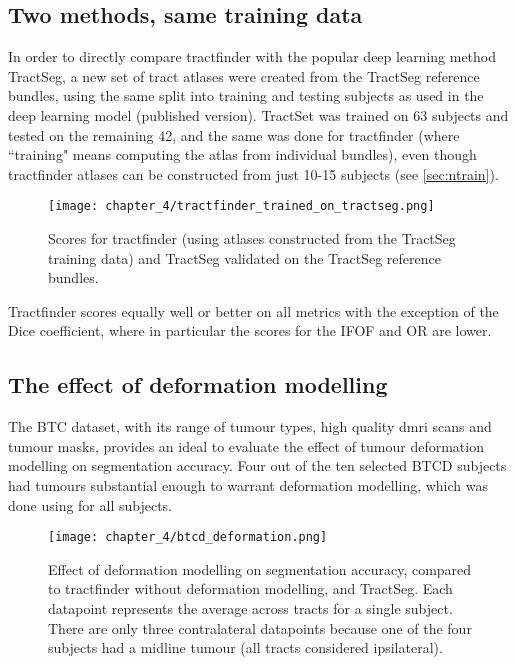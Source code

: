 \subsection{Two methods, same training data}


In order to directly compare tractfinder with the popular deep learning method TractSeg, a new set of tract atlases were created from the TractSeg reference bundles, using the same split into training and testing subjects as used in the deep learning model (published version).
TractSet was trained on 63 subjects and tested on the remaining 42, and the same was done for tractfinder (where ``training" means computing the atlas from individual bundles), even though tractfinder atlases can be constructed from just 10-15 subjects (see \ref{sec:ntrain}).

\begin{figure}
  \texttt{[image: chapter\_4/tractfinder\_trained\_on\_tractseg.png]}
  \caption{Scores for tractfinder (using atlases constructed from the TractSeg training data) and TractSeg validated on the TractSeg reference bundles.}
  \label{fig:ts_atlas}
\end{figure}

Tractfinder scores equally well or better on all metrics with the exception of the Dice coefficient, where in particular the scores for the IFOF and OR are lower.


\subsection{The effect of deformation modelling}

The BTC dataset, with its range of tumour types, high quality \gls{dmri} scans and tumour masks, provides an ideal  to evaluate the effect of tumour deformation modelling on segmentation accuracy.
Four out of the ten selected BTCD subjects had tumours substantial enough to warrant deformation modelling, which was done using  for all subjects.

\begin{figure}
  \texttt{[image: chapter\_4/btcd\_deformation.png]}
  \caption{Effect of deformation modelling on segmentation accuracy, compared to tractfinder without deformation modelling, and TractSeg. Each datapoint represents the average across tracts for a single subject. There are only three contralateral datapoints because one of the four subjects had a midline tumour (all tracts considered ipsilateral).}
  \label{fig:btcd_def}
\end{figure}

